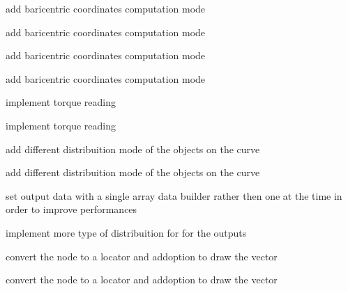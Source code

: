 
\begin{DoxyRefList}
\item[\label{todo__todo000001}%
\hypertarget{todo__todo000001}{}%
Class \hyperlink{class_m_g__cache_value}{M\-G\-\_\-cache\-Value} ]add baricentric coordinates computation mode

add baricentric coordinates computation mode 
\item[\label{todo__todo000002}%
\hypertarget{todo__todo000002}{}%
Class \hyperlink{class_m_g__poly_rivet}{M\-G\-\_\-poly\-Rivet} ]add baricentric coordinates computation mode

add baricentric coordinates computation mode 
\item[\label{todo__todo000003}%
\hypertarget{todo__todo000003}{}%
Class \hyperlink{class_m_g__pose_reader}{M\-G\-\_\-pose\-Reader} ]implement torque reading

implement torque reading 
\item[\label{todo__todo000004}%
\hypertarget{todo__todo000004}{}%
Class \hyperlink{class_m_g__spline_path}{M\-G\-\_\-spline\-Path} ]add different distribuition mode of the objects on the curve

add different distribuition mode of the objects on the curve 
\item[\label{todo__todo000010}%
\hypertarget{todo__todo000010}{}%
Class \hyperlink{class_m_g__twist}{M\-G\-\_\-twist} ]set output data with a single array data builder rather then one at the time in order to improve performances 

implement more type of distribuition for for the outputs 
\item[\label{todo__todo000009}%
\hypertarget{todo__todo000009}{}%
Class \hyperlink{class_m_g__vector}{M\-G\-\_\-vector} ]convert the node to a locator and addoption to draw the vector

convert the node to a locator and addoption to draw the vector
\end{DoxyRefList}